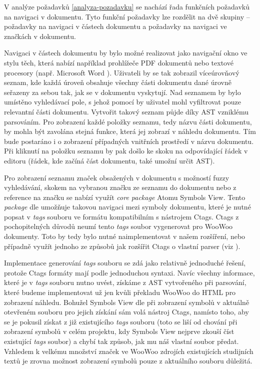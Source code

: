 V analýze požadavků \ref{analyza-pozadavku} se nachází řada funkčních požadavků na navigaci v dokumentu. Tyto funkční
požadavky lze rozdělit na dvě skupiny – požadavky na navigaci v částech dokumentu a požadavky na navigaci ve značkách v
dokumentu.

Navigaci v částech dokumentu by bylo možné realizovat jako navigační okno ve stylu těch, která nabízí například
prohlížeče PDF dokumentů nebo textové procesory (např. Microsoft Word \cite{word-docs}). Uživateli by se tak zobrazil
víceúrovňový seznam, kde každá úroveň obsahuje všechny části dokumentu dané úrovně seřazeny za sebou tak, jak se v
dokumentu vyskytují. Nad seznamem by bylo umístěno vyhledávací pole, s jehož pomocí by uživatel mohl vyfiltrovat pouze
relevantní části dokumentu. Vytvořit takový seznam půjde díky AST vzniklému parsováním. Pro zobrazení každé položky
seznamu, tedy názvu části dokumentu, by mohla být zavolána stejná funkce, která jej zobrazí v náhledu dokumentu. Tím
bude postaráno i o zobrazení případných vnitřních prostředí v názvu dokumentu. Při kliknutí na položku seznamu by pak
došlo ke skoku na odpovídající řádek v editoru (řádek, kde začíná část dokumentu, také umožní určit AST).

Pro zobrazení seznamu značek obsažených v dokumentu s možností fuzzy vyhledávání, skokem na vybranou značku ze seznamu
do dokumentu nebo z reference na značku se nabízí využít \textit{core package} Atomu Symbols View. Tento
\textit{package} dle \cite{atom-package-symbols-view} umožňuje takovou navigaci mezi symboly dokumentu, které je nutné
popsat v \textit{tags} souboru ve formátu kompatibilním s nástrojem Ctags. Ctags z pochopitelných důvodů neumí tento
\textit{tags} soubor vygenerovat pro WooWoo dokumenty. Toto by tedy bylo nutné naimplementovat v našem rozšíření, nebo
případně využít jednoho ze způsobů jak rozšířit Ctags o vlastní parser (viz \cite{ctags-docs}).

Implementace generování \textit{tags} souboru se zdá jako relativně jednoduché řešení, protože Ctags formáty mají
podle \cite{ctags-docs} jednoduchou syntaxi. Navíc všechny informace, které je v \textit{tags} souboru nutno uvést,
získáme z AST vytvořeného při parsování, které budeme implementovat už jen kvůli překladu WooWoo do HTML pro zobrazení
náhledu. Bohužel Symbols View dle \cite{atom-package-symbols-view-github} při zobrazení symbolů v aktuálně otevřeném
souboru pro jejich získání sám volá nástroj Ctags, namísto toho, aby se je pokusil získat z již existujícího
\textit{tags} souboru (toto se liší od chování při zobrazení symbolů v celém projektu, kdy Symbols View nejprve zkouší
číst existující \textit{tags} soubor) a chybí tak způsob, jak mu náš vlastní soubor předat. Vzhledem k velkému množství
značek ve WooWoo zdrojích existujících studijních textů je zrovna možnost zobrazení symbolů pouze z aktuálního souboru
důležitá.

